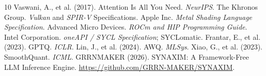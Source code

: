 \documentclass[11pt,a4paper]{article}
\begin{document}
\begin{thebibliography}{10}
 Vaswani, A., et al. (2017). Attention Is All You Need. \emph{NeurIPS}.
 The Khronos Group. \emph{Vulkan} and \emph{SPIR-V} Specifications.
 Apple Inc. \emph{Metal Shading Language Specification}.
 Advanced Micro Devices. \emph{ROCm and HIP Programming Guide}.
 Intel Corporation. \emph{oneAPI / SYCL Specification}; SYCLomatic.
 Frantar, E., et al. (2023). GPTQ. \emph{ICLR}.
 Lin, J., et al. (2024). AWQ. \emph{MLSys}.
 Xiao, G., et al. (2023). SmoothQuant. \emph{ICML}.
 GRRNMAKER (2026). SYNAXIM: A Framework-Free LLM Inference Engine.
\url{https://github.com/GRRN-MAKER/SYNAXIM}.
\end{thebibliography}
\end{document}
